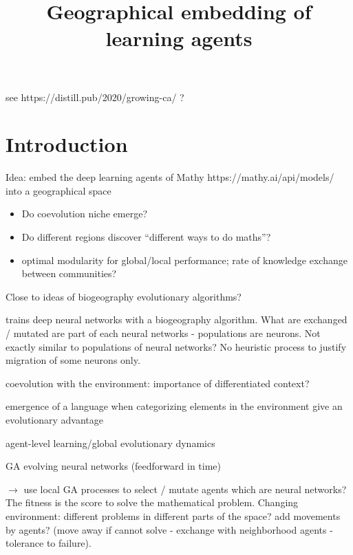 \documentclass{article}
\title{Geographical embedding of learning agents}
\author{}
\date{}
\begin{document}
\maketitle

see https://distill.pub/2020/growing-ca/ ?

\section{Introduction}

Idea: embed the deep learning agents of Mathy https://mathy.ai/api/models/ into a geographical space 

\begin{itemize}
    \item Do coevolution niche emerge?
    \item Do different regions discover ``different ways to do maths''?
    \item optimal modularity for global/local performance; rate of knowledge exchange between communities?
\end{itemize}

Close to ideas of biogeography evolutionary algorithms?

\cite{mirjalili2014let} trains deep neural networks with a biogeography algorithm. What are exchanged / mutated are part of each neural networks - populations are neurons. Not exactly similar to populations of neural networks? No heuristic process to justify migration of some neurons only.


\cite{bruce2001evolving}

\cite{lund1995preadaptation} coevolution with the environment: importance of differentiated context?

\cite{cangelosi1998emergence} emergence of a language when categorizing elements in the environment give an evolutionary advantage

\cite{nolfi1994learning} agent-level learning/global evolutionary dynamics

\cite{beer1992evolving} GA evolving neural networks (feedforward in time)

\cite{stanley2002evolving}

$\rightarrow$ use local GA processes to select / mutate agents which are neural networks? The fitness is the score to solve the mathematical problem. Changing environment: different problems in different parts of the space? add movements by agents? (move away if cannot solve - exchange with neighborhood agents - tolerance to failure).

\cite{denaro1997cultural}
\end{document}

